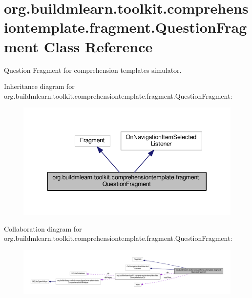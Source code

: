 \hypertarget{classorg_1_1buildmlearn_1_1toolkit_1_1comprehensiontemplate_1_1fragment_1_1QuestionFragment}{}\section{org.\+buildmlearn.\+toolkit.\+comprehensiontemplate.\+fragment.\+Question\+Fragment Class Reference}
\label{classorg_1_1buildmlearn_1_1toolkit_1_1comprehensiontemplate_1_1fragment_1_1QuestionFragment}


Question Fragment for comprehension template\textquotesingle{}s simulator.  




Inheritance diagram for org.\+buildmlearn.\+toolkit.\+comprehensiontemplate.\+fragment.\+Question\+Fragment\+:
\nopagebreak
\begin{figure}[H]
\begin{center}
\leavevmode
\includegraphics[width=343pt]{classorg_1_1buildmlearn_1_1toolkit_1_1comprehensiontemplate_1_1fragment_1_1QuestionFragment__inherit__graph}
\end{center}
\end{figure}


Collaboration diagram for org.\+buildmlearn.\+toolkit.\+comprehensiontemplate.\+fragment.\+Question\+Fragment\+:
\nopagebreak
\begin{figure}[H]
\begin{center}
\leavevmode
\includegraphics[width=350pt]{classorg_1_1buildmlearn_1_1toolkit_1_1comprehensiontemplate_1_1fragment_1_1QuestionFragment__coll__graph}
\end{center}
\end{figure}
